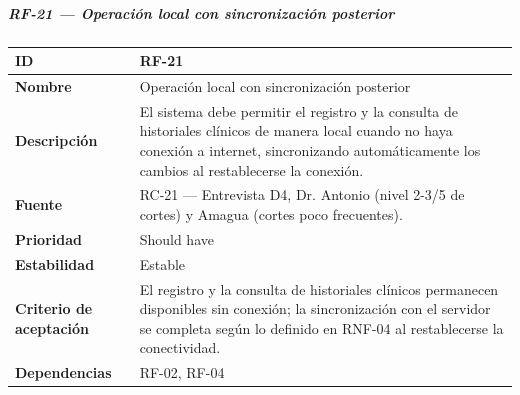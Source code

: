 \subparagraph{RF-21 --- Operación local con sincronización
posterior}\label{rf-21-operaciuxf3n-local-con-sincronizaciuxf3n-posterior}

{\def\LTcaptype{none} %
\begin{longtable}[]{@{}
  >{\raggedright\arraybackslash}p{}
  >{\raggedright\arraybackslash}p{}@{}}
\toprule\noalign{}
\begin{minipage}[b]{\linewidth}\raggedright
\textbf{ID}
\end{minipage} & \begin{minipage}[b]{\linewidth}\raggedright
RF-21
\end{minipage} \\
\midrule\noalign{}
\endhead
\bottomrule\noalign{}
\endlastfoot
\textbf{Nombre} & \begin{minipage}[t]{\linewidth}\raggedright
Operación local con sincronización posterior
\end{minipage} \\
\textbf{Descripción} & \begin{minipage}[t]{\linewidth}\raggedright
El sistema debe permitir el registro y la consulta de historiales
clínicos de manera local cuando no haya conexión a internet, sincronizando automáticamente
los cambios al restablecerse la conexión.
\end{minipage} \\
\textbf{Fuente} & \begin{minipage}[t]{\linewidth}\raggedright
RC-21 --- Entrevista D4, Dr. Antonio (nivel 2-3/5 de cortes) y Amagua
(cortes poco frecuentes).
\end{minipage} \\
\textbf{Prioridad} & \begin{minipage}[t]{\linewidth}\raggedright
Should have
\end{minipage} \\
\textbf{Estabilidad} & \begin{minipage}[t]{\linewidth}\raggedright
Estable
\end{minipage} \\
\textbf{Criterio de aceptación} &
\begin{minipage}[t]{\linewidth}\raggedright
El registro y la consulta de historiales clínicos permanecen disponibles
sin conexión; la sincronización con el servidor se completa según lo definido en
RNF-04 al restablecerse la conectividad.
\end{minipage} \\
\textbf{Dependencias} & \begin{minipage}[t]{\linewidth}\raggedright
RF-02, RF-04
\end{minipage} \\
\end{longtable}
}

